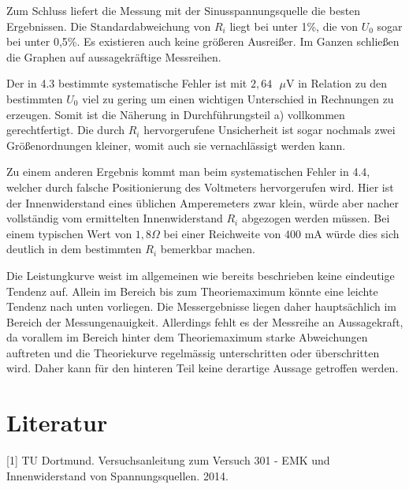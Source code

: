 Zum Schluss liefert die Messung mit der Sinusspannungsquelle die besten Ergebnissen.
Die Standardabweichung von $R_i$ liegt bei unter 1\%, die von $U_0$ sogar bei unter 0,5\%.
 Es existieren auch keine größeren Ausreißer.
 Im Ganzen schließen die Graphen auf aussagekräftige Messreihen.

Der in 4.3 bestimmte systematische Fehler ist mit $2,64\text{ }\mu$V in Relation zu den bestimmten $U_0$ viel zu gering
um einen wichtigen Unterschied in Rechnungen zu erzeugen. Somit ist die Näherung in Durchführungsteil a)
 vollkommen gerechtfertigt. Die durch $R_i$ hervorgerufene Unsicherheit ist sogar nochmals
 zwei Größenordnungen kleiner, womit auch sie vernachlässigt werden kann.

 Zu einem anderen Ergebnis kommt man beim systematischen Fehler in 4.4, welcher durch falsche Positionierung des Voltmeters hervorgerufen wird.
Hier ist der Innenwiderstand eines üblichen Amperemeters zwar klein, würde aber nacher vollständig vom ermittelten Innenwiderstand $R_i$ abgezogen werden müssen. Bei einem typischen Wert von $1,8\Omega$ bei einer Reichweite von $400$ mA würde dies sich deutlich in dem bestimmten $R_i$ bemerkbar machen.

Die Leistungkurve weist im allgemeinen wie bereits beschrieben keine eindeutige Tendenz auf. Allein im Bereich bis zum Theoriemaximum
könnte eine leichte Tendenz nach unten vorliegen. Die Messergebnisse liegen daher hauptsächlich
 im Bereich der Messungenauigkeit. Allerdings fehlt es der Messreihe an Aussagekraft, da vorallem im Bereich
  hinter dem Theoriemaximum starke Abweichungen auftreten und die Theoriekurve regelmässig
  unterschritten oder überschritten wird. Daher kann für den hinteren Teil keine derartige Aussage getroffen werden.

\section{Literatur}
[1] TU Dortmund. Versuchsanleitung zum Versuch 301
- EMK und Innenwiderstand von Spannungsquellen. 2014.
